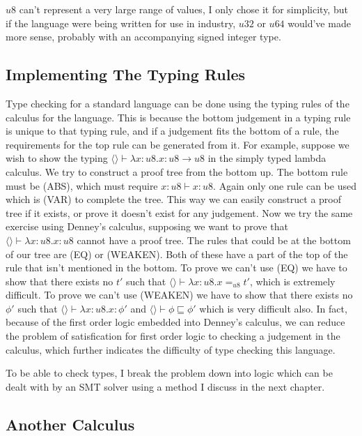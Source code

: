 $u8$ can't represent a very large range of values, I only chose it for simplicity, but if the
language were being written for use in industry, $u32$ or $u64$ would've made more sense,
probably with an accompanying signed integer type.

\subsection{Implementing The Typing Rules}

Type checking for a standard language can be done using the typing rules of the calculus for the language.
This is because the bottom judgement in a typing rule is unique to that typing rule, and if a judgement
fits the bottom of a rule, the requirements for the top rule can be generated from it.
For example, suppose we wish to show the typing $\langle \rangle \vdash \lambda x: u8 . x: u8 \rightarrow u8$
in the simply typed lambda calculus.
We try to construct a proof tree from the bottom up.
The bottom rule must be (ABS), which must require $x:u8 \vdash x : u8$.
Again only one rule can be used which is (VAR) to complete the tree.
This way we can easily construct a proof tree if it exists, or prove it doesn't exist for any judgement.
Now we try the same exercise using Denney's calculus, supposing we want to prove that
$\langle \rangle \vdash \lambda x: u8 . x : u8$ cannot have a proof tree.
The rules that could be at the bottom of our tree are (EQ) or (WEAKEN).
Both of these have a part of the top of the rule that isn't mentioned in the bottom.
To prove we can't use (EQ) we have to show that there exists no $t'$ such that
$\langle \rangle \vdash \lambda x: u8 . x =_{u8} t'$, which is extremely difficult.
To prove we can't use (WEAKEN) we have to show that there exists no $\phi'$ such that
$\langle \rangle \vdash \lambda x: u8 . x : \phi'$ and $\langle \rangle \vdash \phi \sqsubseteq \phi'$
which is very difficult also.
In fact, because of the first order logic embedded into Denney's calculus, we can reduce the
problem of satisfication for first order logic to checking a judgement in the calculus, which
further indicates the difficulty of type checking this language.

To be able to check types, I break the problem down into logic which can be dealt with by an SMT
solver using a method I discuss in the next chapter.

\subsection{Another Calculus}

